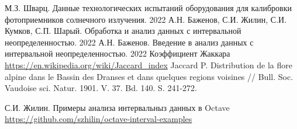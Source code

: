 
\begin{thebibliography}{}
     М.З. Шварц. Данные технологических испытаний оборудования для калибровки фотоприемников солнечного излучения. 2022
     А.Н. Баженов, С.И. Жилин, С.И. Кумков, С.П. Шарый. Обработка и анализ данных с интервальной неопределенностью. 2022
     А.Н. Баженов. Введение в анализ данных с интервальной неопределенностью. 2022
     Коэффициент Жаккара \url{https://en.wikipedia.org/wiki/Jaccard\_index}
Jaccard P. Distribution de la flore alpine dans le Bassin des Dranses et dans quelques
regions voisines // Bull. Soc. Vaudoise sci. Natur. 1901. V. 37. Bd. 140. S. 241-272.

     С.И. Жилин. Примеры анализа интервальныз данных в Octave \url{https://github.com/szhilin/octave-interval-examples}
\end{thebibliography}